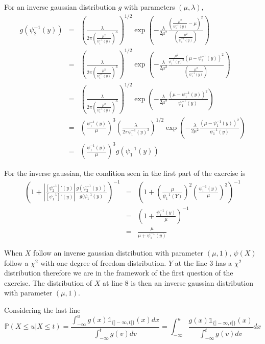For an inverse gaussian distribution $g$ with parameters $(\mu,\lambda)$,
\begin{eqnarray*}
	g(\psi_2^{-1}(y)) &=& \left( \frac{\lambda}{2 \pi \left(\frac{\mu^2}{\psi_1^{-1}(y)}\right)^3} \right)^{1/2} \exp\left( -\frac{\lambda}{2\mu^2} \frac{\left(\frac{\mu^2}{\psi_1^{-1}(y)} - \mu \right)^2}{\left( \frac{\mu^2}{\psi_1^{-1}(y)} \right)} \right)\\
	&=& \left( \frac{\lambda}{2 \pi \left(\frac{\mu^2}{\psi_1^{-1}(y)}\right)^3} \right)^{1/2} \exp\left( -\frac{\lambda}{2\mu^2} \frac{\frac{\mu^2}{\psi_1^{-1}(y)^2}\left(\mu - \psi_1^{-1}(y) \right)^2}{\left( \frac{\mu^2}{\psi_1^{-1}(y)} \right)} \right)\\
	&=& \left( \frac{\lambda}{2 \pi \left(\frac{\mu^2}{\psi_1^{-1}(y)}\right)^3} \right)^{1/2} \exp\left( -\frac{\lambda}{2\mu^2} \frac{\left(\mu - \psi_1^{-1}(y) \right)^2}{\psi_1^{-1}(y)} \right)\\
	&=& \left( \frac{\psi_1^{-1}(y)}{\mu} \right)^3 \left( \frac{\lambda}{2 \pi \psi_1^{-1}(y)^3} \right)^{1/2} \exp\left( -\frac{\lambda}{2\mu^2} \frac{\left(\mu - \psi_1^{-1}(y) \right)^2}{\psi_1^{-1}(y)} \right)\\
	&=& \left( \frac{\psi_1^{-1}(y)}{\mu} \right)^3 g(\psi_1^{-1}(y)) 
\end{eqnarray*}

For the inverse gaussian, the condition seen in the first part of the exercise is
\begin{eqnarray*}
	\left(1 + \left| \frac{[\psi_2^{-1}]'(y)}{[\psi_1^{-1}]'(y)} \right| \frac {g(\psi_2^{-1}(y))}{g(\psi_1^{-1}(y)} \right)^{-1} &=& \left( 1 + \left(\frac{\mu}{\psi_1^{-1}(Y)}\right)^2 \left( \frac{\psi_1^{-1}(y)}{\mu} \right)^3 \right)^{-1}\\
	&=& \left( 1 + \frac{\psi_1^{-1}(y)}{\mu}\right)^{-1}\\
	&=&\frac{\mu}{\mu + \psi_1^{-1}(y)} 
\end{eqnarray*}

When $X$ follow an inverse gaussian distribution with parameter $(\mu,1)$, $\psi(X)$ follow a $\chi^2$ with one degree of freedom distribution.
$Y$ at the line 3 has a $\chi^2$ distribution therefore we are in the framework of the first question of the exercise.
The distribution of $X$ at line $8$ is then an inverse gaussian distribution with parameter $(\mu,1)$.

Considering the last line
\[ \mathbb{P}(X \leq u | X \leq t) = \frac{\int_{-\infty}^u g(x) \mathbb{1}_{\{]-\infty, t]\}}(x) dx}{\int_{-\infty}^t g(v)dv} =  \int_{-\infty}^u \frac{g(x)\mathbb{1}_{\{]-\infty, t]\}}(x)}{\int_{-\infty}^t g(v)dv}dx\]

